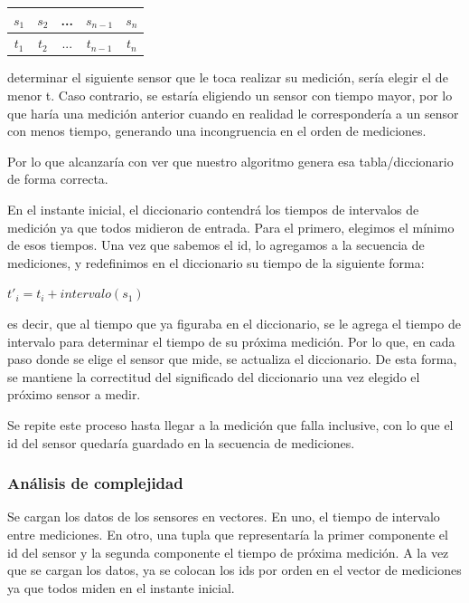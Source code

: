 \quad


\begin{tabular}{| c | c | c | c | c |}
\hline
$ s_1 $ & $ s_2 $ & ... & $ s_{n-1} $ & $ s_n $\\
\hline
$ t_1 $ & $ t_2 $ & ... & $ t_{n-1} $ & $ t_n $\\
\hline

\end{tabular}



\quad


\quad determinar el siguiente sensor que le toca realizar su medici\'on, ser\'ia elegir el de menor t. Caso contrario, se estar\'ia eligiendo un sensor con tiempo mayor, por lo que har\'ia una medici\'on anterior cuando en realidad le corresponder\'ia a un sensor con menos tiempo, generando una incongruencia en el orden de mediciones.

\quad Por lo que alcanzar\'ia con ver que nuestro algoritmo genera esa tabla/diccionario de forma correcta.

\quad En el instante inicial, el diccionario contendr\'a los tiempos de intervalos de medici\'on ya que todos midieron de entrada. Para el primero, elegimos el m\'inimo de esos tiempos. Una vez que sabemos el id, lo agregamos a la secuencia de mediciones, y redefinimos en el diccionario su tiempo de la siguiente forma:


\quad


$ t'_{i} = t_{i} + intervalo(s_1) $


\quad


\quad es decir, que al tiempo que ya figuraba en el diccionario, se le agrega el tiempo de intervalo para determinar el tiempo de su pr\'oxima medici\'on. Por lo que, en cada paso donde se elige el sensor que mide, se actualiza el diccionario. De esta forma, se mantiene la correctitud del significado del diccionario una vez elegido el pr\'oximo sensor a medir.

\quad Se repite este proceso hasta llegar a la medici\'on que falla inclusive, con lo que el id del sensor quedar\'ia guardado en la secuencia de mediciones.


\subsubsection{An\'alisis de complejidad}

\quad Se cargan los datos de los sensores en vectores. En uno, el tiempo de intervalo entre mediciones. En otro, una tupla que representar\'ia la primer componente el id del sensor y la segunda componente el tiempo de pr\'oxima medici\'on. A la vez que se cargan los datos, ya se colocan los ids por orden en el vector de mediciones ya que todos miden en el instante inicial.

